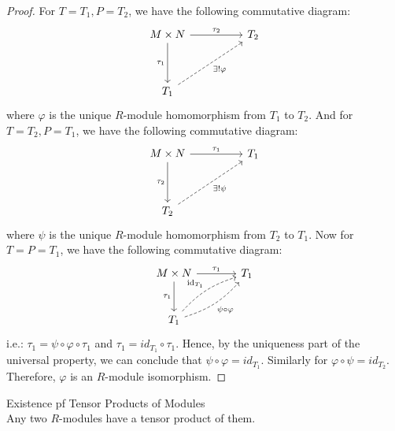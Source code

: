 \begin{proof}
    For $T=T_1,P=T_2$, we have the following commutative diagram:
    \[
    \begin{tikzcd}
    M \times N \arrow[rr, "\tau_2"] \arrow[dd, "\tau_1"'] & & T_2 \\
    & & \\
    T_1 \arrow[uurr, dashed, "\exists !\varphi"'] & &
    \end{tikzcd}
    \]
    where $\varphi$ is the unique $R$-module homomorphism from $T_1$ to $T_2$. And for $T=T_2,P=T_1$, we have the following commutative diagram:
    \[
    \begin{tikzcd}
    M \times N \arrow[rr, "\tau_1"] \arrow[dd, "\tau_2"'] & & T_1 \\
    & & \\
    T_2 \arrow[uurr, dashed, "\exists !\psi"'] & &
    \end{tikzcd}
    \]
    where $\psi$ is the unique $R$-module homomorphism from $T_2$ to $T_1$. Now for $T=P=T_1$, we have the following commutative diagram:
    \[
    \begin{tikzcd}[row sep=large, column sep=large]
    M \times N \arrow[r, "\tau_1"] \arrow[d, "\tau_1"'] & T_1 \\
    T_1 \arrow[ur, dashed, bend left=15, "\mathrm{id}_{T_1}"] \arrow[ur, dashed, bend right=15, "\psi \circ \varphi"'] & 
    \end{tikzcd}
    \]
    i.e.: $\tau_1= \psi \circ \varphi \circ \tau_1$ and $\tau_1= id_{T_1} \circ \tau_1$. Hence, by the uniqueness part of the universal property, we can conclude that $\psi \circ \varphi= id_{T_1}$. Similarly for $\varphi \circ \psi =id_{T_2}$. Therefore, $\varphi$ is an $R$-module isomorphism.
\end{proof}

\begin{proposition}{Existence pf Tensor Products of Modules}\\
Any two $R$-modules have a tensor product of them.
\end{proposition}

